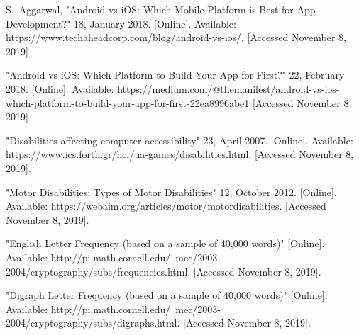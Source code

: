 \documentclass[onecolumn, draftclsnofoot,10pt, journal, letterpaper]{IEEEtran}
\begin{document}
\begin{thebibliography}{1}


S.~Aggarwal, "Android vs iOS: Which Mobile Platform 
is Best for App Development?" 18, January 2018. [Online]. Available: https://www.techaheadcorp.com/blog/android-vs-ios/. [Accessed November 8, 2019]

"Android vs iOS: Which Platform to Build Your App for First?" 22, February 2018. [Online]. Available: https://medium.com/@themanifest/android-vs-ios-which-platform-to-build-your-app-for-first-22ea8996abe1 [Accessed November 8, 2019]

"Disabilities affecting computer accessibility" 23, April 2007. [Online]. Available: https://www.ics.forth.gr/hci/ua-games/disabilities.html. [Accessed November 8, 2019].

"Motor Disabilities: Types of Motor Disabilities" 12, October 2012. [Online]. Available: https://webaim.org/articles/motor/motordisabilities. [Accessed November 8, 2019].

"English Letter Frequency (based on a sample of 40,000 words)" [Online]. Available: http://pi.math.cornell.edu/~mec/2003-2004/cryptography/subs/frequencies.html. [Accessed November 8, 2019].

"Digraph Letter Frequency (based on a sample of 40,000 words)" [Online]. Available: http://pi.math.cornell.edu/~mec/2003-2004/cryptography/subs/digraphs.html. [Accessed November 8, 2019].

\end{thebibliography}
\end{document}
